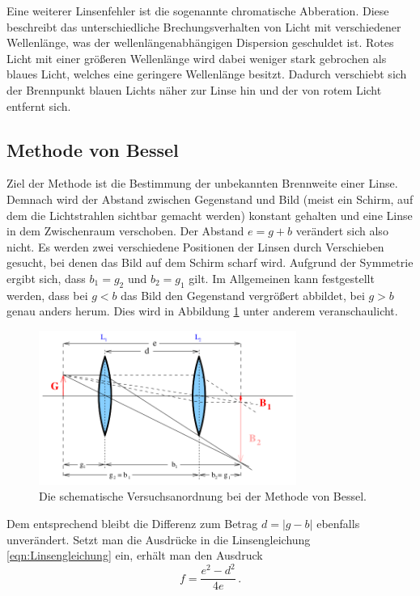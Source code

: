 Eine weiterer Linsenfehler ist die sogenannte chromatische Abberation. 
Diese beschreibt das unterschiedliche Brechungsverhalten von Licht mit verschiedener Wellenlänge, was der wellenlängenabhängigen Dispersion geschuldet ist. 
Rotes Licht mit einer größeren Wellenlänge wird dabei weniger stark gebrochen als blaues Licht, welches eine geringere Wellenlänge besitzt. 
Dadurch verschiebt sich der Brennpunkt blauen Lichts näher zur Linse hin und der von rotem Licht entfernt sich\cite{Versuchsanleitung}. 

\subsection{Methode von Bessel}

Ziel der Methode ist die Bestimmung der unbekannten Brennweite einer Linse. 
Demnach wird der Abstand zwischen Gegenstand und Bild (meist ein Schirm, auf dem die Lichtstrahlen sichtbar 
gemacht werden) konstant gehalten und eine Linse in dem Zwischenraum verschoben. 
Der Abstand $e=g+b$ verändert sich also nicht. 
Es werden zwei verschiedene Positionen der Linsen durch Verschieben gesucht, bei denen das Bild auf dem Schirm scharf wird. 
Aufgrund der Symmetrie ergibt sich, dass $b_1=g_2$ und $b_2=g_1$ gilt. 
Im Allgemeinen kann festgestellt werden, dass bei $g<b$ das Bild den Gegenstand vergrößert abbildet, bei $g>b$ genau anders herum. 
Dies wird in Abbildung \ref{fig:Bessel} unter anderem veranschaulicht. 

\begin{figure}
    \centering
    \includegraphics[width=0.75\textwidth]{plots/2Linsen.png}
    \caption{Die schematische Versuchsanordnung bei der Methode von Bessel\cite{Versuchsanleitung}.}
    \label{fig:Bessel}
\end{figure}

Dem entsprechend bleibt die Differenz zum Betrag $d=|g-b|$ ebenfalls unverändert. 
Setzt man die Ausdrücke in die Linsengleichung \eqref{eqn:Linsengleichung} ein, erhält man den Ausdruck\cite{Versuchsanleitung} 
\begin{equation}
    f=\frac{e^2-d^2}{4e}\,.
    \label{eqn:Bessel}
\end{equation}

